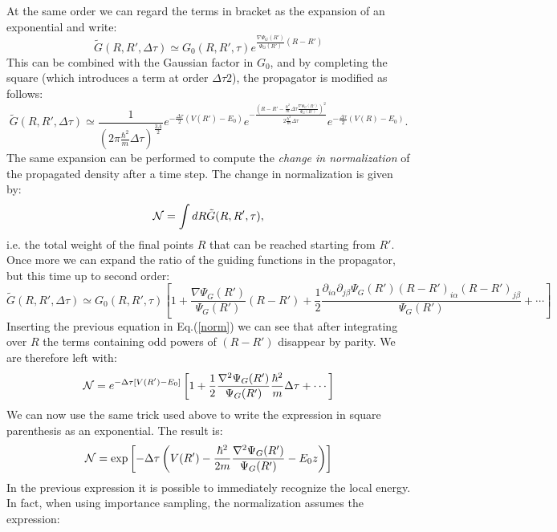 At the same order we can regard the terms in bracket as the expansion of an exponential and write:
 \begin{equation}
 \tilde{G}(R,R',\Delta\tau)\simeq G_0(R,R',\tau)e^{\frac{\nabla\Psi_G(R')}
 	{\Psi_G(R')}(R-R')}
 \end{equation}
This can be combined with the Gaussian factor in $G_0$, and by completing the square (which introduces a term at order $\Delta\tau2$), the propagator is modified as follows:
\begin{equation}
\tilde{G}(R,R',\Delta\tau)\simeq\frac{1}{(2\pi\frac{\hbar^2}{m}\Delta\tau)^\frac{3A}{2}}e^{-\frac{\Delta\tau}{2}(V(R')-E_0)} e^{-\frac{(R-R'-\frac{\hbar^2}{m}\Delta\tau\frac{\nabla\Psi_G(R')}{\Psi_G(R')})^2}{2\frac{\hbar^2}{m}\Delta\tau}}e^{-\frac{\Delta\tau}{2}(V(R)-E_0)}.
\end{equation}
The same expansion can be performed to compute the {\it change in normalization} of the propagated density after a time step. The change in normalization is given by:
\begin{equation}
{\cal N}=\int dR \tilde{G}(R,R',\tau),\label{norm}
\end{equation}
i.e. the total weight of the final points $R$ that can be reached starting from $R'$.
Once more we can expand the ratio of the guiding functions in the propagator, but this time up to second order:
\begin{equation}
\tilde{G}(R,R',\Delta\tau)\simeq G_0(R,R',\tau)\left[1+\frac{\nabla\Psi_G(R')}{\Psi_G(R')}(R-R')+\frac{1}{2}\frac{\partial_{i\alpha}
\partial_{j\beta}\Psi_G(R')(R-R')_{i\alpha}(R-R')_{j\beta}}{\Psi_G(R')}+\cdots\right]
\end{equation}
Inserting the previous equation in Eq.(\ref{norm}) we can see that after integrating over $R$ the terms containing odd powers of $(R-R')$ disappear by parity. We are therefore left with:
\begin{equation}
{\cal N}=e^{-\Delta\tau[V(R')-E_0]}\left[1+\frac{1}{2}\frac{\nabla^2\Psi_G(R')}{\Psi_G(R')}\frac{\hbar^2}{m}\Delta\tau+\cdots\right]
\end{equation}
We can now use the same trick used above to write the expression in square parenthesis as an exponential. The result is:
\begin{equation}
{\cal N}= \exp\left[-\Delta\tau\left(V(R')-\frac{\hbar^2}{2m}\frac{\nabla^2\Psi_G(R')}{\Psi_G(R')}-E_0z\right)\right]
\end{equation}
In the previous expression it is possible to immediately recognize the local energy. In fact, when using importance sampling, the normalization assumes the expression:
